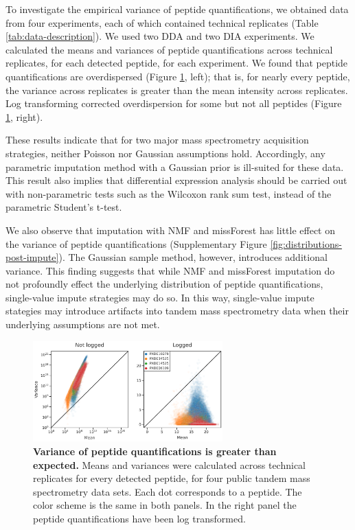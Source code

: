 \documentclass{article}
\begin{document}
To investigate the empirical variance of peptide quantifications, we obtained data from four experiments, each of which contained technical replicates (Table \ref{tab:data-description}). We used two DDA and two DIA experiments. We calculated the means and variances of peptide quantifications across technical replicates, for each detected peptide, for each experiment. We found that peptide quantifications are overdispersed (Figure \ref{fig:mean-x-var}, left); that is, for nearly every peptide, the variance across replicates is greater than the mean intensity across replicates. Log transforming corrected overdispersion for some but not all peptides (Figure \ref{fig:mean-x-var}, right).

These results indicate that for two major mass spectrometry acquisition strategies, neither Poisson nor Gaussian assumptions hold. Accordingly, any parametric imputation method with a Gaussian prior is ill-suited for these data. This result also implies that differential expression analysis should be carried out with non-parametric tests such as the Wilcoxon rank sum test, instead of the parametric Student's t-test. 

We also observe that imputation with NMF and missForest has little effect on the variance of peptide quantifications (Supplementary Figure \ref{fig:distributions-post-impute}). The Gaussian sample method, however, introduces additional variance. This finding suggests that while NMF and missForest imputation do not profoundly effect the underlying distribution of peptide quantifications, single-value impute strategies may do so. In this way, single-value impute stategies may introduce artifacts into tandem mass spectrometry data when their underlying assumptions are not met. 


\begin{figure}
  \centering
  \includegraphics[width=0.65\textwidth]{figures/mean-x-var-figure-v3.png}
  \caption{{\bf Variance of peptide quantifications is greater than expected.} Means and variances were calculated across technical replicates for every detected peptide, for four public tandem mass spectrometry data sets. Each dot corresponds to a peptide. The color scheme is the same in both panels. In the right panel the peptide quantifications have been log transformed.}
  \label{fig:mean-x-var}
\end{figure} 
\end{document}
